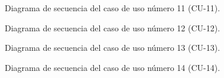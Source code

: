 \begin{figure}[htbp!]
	\begin{center}
		\caption{Diagrama de secuencia del caso de uso número 11 (CU-11).}
		\label{fig:Diagrama de secuencia CU-1}
	\end{center}
\end{figure}

\begin{figure}[htbp!]
	\begin{center}
		\caption{Diagrama de secuencia del caso de uso número 12 (CU-12).}
		\label{fig:Diagrama de secuencia CU-12}
	\end{center}
\end{figure}

\begin{figure}[htbp!]
	\begin{center}
		\caption{Diagrama de secuencia del caso de uso número 13 (CU-13).}
		\label{fig:Diagrama de secuencia CU-13}
	\end{center}
\end{figure}

\begin{figure}[htbp!]
	\begin{center}
		\caption{Diagrama de secuencia del caso de uso número 14 (CU-14).}
		\label{fig:Diagrama de secuencia CU-14}
	\end{center}
\end{figure}

